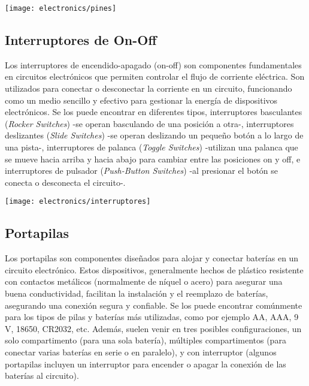 \begin{center}
  \centering
  \texttt{[image: electronics/pines]}
  \label{fig:pines}
\end{center}

\subsection{Interruptores de On-Off}
Los interruptores de encendido-apagado (on-off) son componentes fundamentales en circuitos electrónicos que permiten controlar el flujo de corriente eléctrica. Son utilizados para conectar o desconectar la corriente en un circuito, funcionando como un medio sencillo y efectivo para gestionar la energía de dispositivos electrónicos. Se los puede encontrar en diferentes tipos, interruptores basculantes (\textit{Rocker Switches}) -se operan basculando de una posición a otra-, interruptores deslizantes (\textit{Slide Switches}) -se operan deslizando un pequeño botón a lo largo de una pista-, interruptores de palanca (\textit{Toggle Switches}) -utilizan una palanca que se mueve hacia arriba y hacia abajo para cambiar entre las posiciones on y off, e interruptores de pulsador (\textit{Push-Button Switches}) -al presionar el botón se conecta o desconecta el circuito-.

\begin{center}
  \centering
  \texttt{[image: electronics/interruptores]}
  \label{fig:interruptores}
\end{center}

\subsection{Portapilas}

Los portapilas son componentes diseñados para alojar y conectar baterías en un circuito electrónico. Estos dispositivos, generalmente hechos de plástico resistente con contactos metálicos (normalmente de níquel o acero) para asegurar una buena conductividad, facilitan la instalación y el reemplazo de baterías, asegurando una conexión segura y confiable. Se los puede encontrar comúnmente para los tipos de pilas y baterías más utilizadas, como por ejemplo AA, AAA, 9 V, 18650, CR2032, etc. Además, suelen venir en tres posibles configuraciones, un solo compartimento (para una sola batería), múltiples compartimentos (para conectar varias baterías en serie o en paralelo), y con interruptor (algunos portapilas incluyen un interruptor para encender o apagar la conexión de las baterías al circuito).

